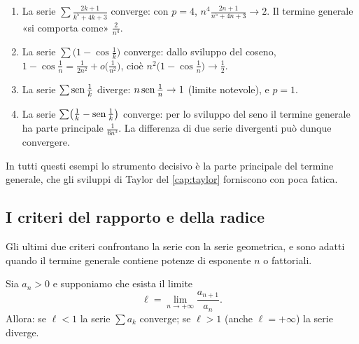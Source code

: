 \begin{esempio}\label{es:infinitesimi}
\begin{enumerate}[label=(\alph*)]
  \item La serie $\sum\frac{2k+1}{k^{5}+4k+3}$ converge: con $p=4$,
  $n^{4}\frac{2n+1}{n^{5}+4n+3}\to2$. Il termine generale «si comporta come» $\frac2{n^{4}}$.
  \item La serie $\sum\bigl(1-\cos\frac1k\bigr)$ converge: dallo sviluppo del coseno,
  $1-\cos\frac1n=\frac1{2n^{2}}+o\bigl(\frac1{n^{2}}\bigr)$, cioè $n^{2}\bigl(1-\cos\frac1n\bigr)\to\frac12$.
  \item La serie $\sum\operatorname{sen}\frac1k$ diverge: $n\operatorname{sen}\frac1n\to1$ (limite notevole), e $p=1$.
  \item La serie $\sum\bigl(\frac1k-\operatorname{sen}\frac1k\bigr)$ converge: per lo sviluppo del seno il termine
  generale ha parte principale $\frac1{6n^{3}}$. La differenza di due serie divergenti può
  dunque convergere.
\end{enumerate}
In tutti questi esempi lo strumento decisivo è la parte principale del termine generale,
che gli sviluppi di Taylor del \cref{cap:taylor} forniscono con poca fatica.
\end{esempio}

\subsection{I criteri del rapporto e della radice}

Gli ultimi due criteri confrontano la serie con la serie geometrica, e sono adatti
quando il termine generale contiene potenze di esponente $n$ o fattoriali.

\begin{teorema}\label{teo:criterio-rapporto-serie}
Sia $a_{n}>0$ e supponiamo che esista il limite
\begin{equation}\label{eq:limite-rapporto}
  \ell=\lim_{n\to+\infty}\frac{a_{n+1}}{a_{n}} .
\end{equation}
Allora: se $\ell<1$ la serie $\sum a_{k}$ converge; se $\ell>1$ (anche $\ell=+\infty$) la serie
diverge.
\end{teorema}

\begin{schema}
\end{schema}

